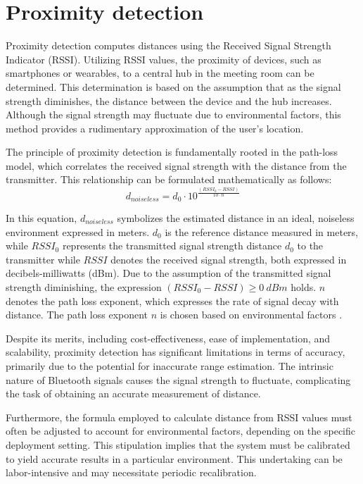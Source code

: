 \section{Proximity detection}\label{sec:proximity_detection}
Proximity detection computes distances using the Received Signal Strength Indicator (RSSI).
Utilizing RSSI values, the proximity of devices, such as smartphones or wearables, to a central hub in the meeting room can be determined. 
This determination is based on the assumption that as the signal strength diminishes, the distance between the device and the hub increases. 
Although the signal strength may fluctuate due to environmental factors, this method provides a rudimentary approximation of the user's location.\cite{spachosBLEBeaconsIndoor2020}

The principle of proximity detection is fundamentally rooted in the path-loss model, which correlates the received signal strength with the distance from the transmitter. This relationship can be formulated mathematically as follows:\cite{spachosBLEBeaconsIndoor2020}
$$
d_{noiseless} = d_0 \cdot 10^{ \frac{(RSSI_{0} - RSSI)}{10 \cdot n}}
$$

In this equation, \(d_{noiseless}\) symbolizes the estimated distance in an ideal, noiseless environment expressed in meters.
$d_0$ is the reference distance measured in meters, while \(RSSI_{0}\) represents the transmitted signal strength distance $d_0$ to the transmitter while \(RSSI\) denotes the received signal strength, both expressed in decibels-milliwatts (dBm). 
Due to the assumption of the transmitted signal strength diminishing, the expression $(RSSI_{0} - RSSI) \geq 0\ dBm$ holds. 
\(n\) denotes the path loss exponent, which expresses the rate of signal decay with distance.  
The path loss exponent \(n\) is chosen based on environmental factors \cite{spachosBLEBeaconsIndoor2020}. 

Despite its merits, including cost-effectiveness, ease of implementation, and scalability, proximity detection has significant limitations in terms of accuracy, primarily due to the potential for inaccurate range estimation. The intrinsic nature of Bluetooth signals causes the signal strength to fluctuate, complicating the task of obtaining an accurate measurement of distance.\cite{spachosBLEBeaconsIndoor2020}

Furthermore, the formula employed to calculate distance from RSSI values must often be adjusted to account for environmental factors, depending on the specific deployment setting. This stipulation implies that the system must be calibrated to yield accurate results in a particular environment. This undertaking can be labor-intensive and may necessitate periodic recalibration.\cite{spachosBLEBeaconsIndoor2020}


